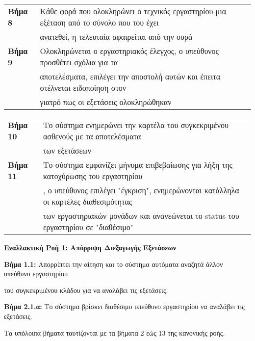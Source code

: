 \documentclass{article}
\newcommand\T{\rule{0pt}{2.6ex}}       %
\newcommand\B{\rule[-1.2ex]{0pt}{0pt}}
\begin{document}
\begin{center}
\begin{tabular}{|l|l|}
      \hline
      \textbf{Βήμα 8} & Κάθε φορά που ολοκληρώνει ο τεχνικός εργαστηρίου μια εξέταση από το σύνολο που του έχει \T \\& ανατεθεί, η τελευταία αφαιρείται από την  ουρά  \B \\
      \hline
      \textbf{Βήμα 9} & Ολοκληρώνεται ο εργαστηριακός έλεγχος, ο υπεύθυνος προσθέτει σχόλια για τα \T\\& αποτελέσματα, επιλέγει την αποστολή αυτών και έπειτα στέλνεται ειδοποίηση στον \\& γιατρό πως οι εξετάσεις ολοκληρώθηκαν \B \\
      \hline
     \end{tabular}
 \end{center}

 \newpage
 
 \begin{center}
     \begin{tabular}{|l|l|}
      \hline
      \textbf{Βήμα 10} & Το σύστημα ενημερώνει την καρτέλα του συγκεκριμένου ασθενούς με τα αποτελέσματα\T\\& των εξετάσεων \B \\
      \hline
      \textbf{Βήμα 11} & Το σύστημα εμφανίζει μήνυμα επιβεβαίωσης για λήξη της κατοχύρωσης του εργαστηρίου \T\\&, ο υπεύθυνος επιλέγει "έγκριση", ενημερώνονται κατάλληλα οι καρτέλες διαθεσιμότητας \\& των εργαστηριακών μονάδων και ανανεώνεται το status του εργαστηρίου σε "διαθέσιμο"\B \\
      \hline
     \end{tabular}
 \end{center}
 
\textbf{\underline{Εναλλακτική Ροή 1:} Απόρριψη Διεξαγωγής Εξετάσεων} \vspace{0.2cm}
\par \textbf{Βήμα 1.1:} Απορρίπτει την αίτηση και το σύστημα αυτόματα αναζητά άλλον υπεύθυνο εργαστηρίου \par του συγκεκριμένου κλάδου για να αναλάβει τις εξετάσεις. \vspace{0.2cm}
\par \textbf{Βήμα 2.1.α:} Το σύστημα βρίσκει διαθέσιμο υπεύθυνο εργαστηρίου να αναλάβει τις εξετάσεις. \vspace{0.2cm}

Tα υπόλοιπα βήματα ταυτίζονται με τα βήματα 2 εώς 13 της κανονικής ροής. \vspace{0.2cm}
\end{document}
